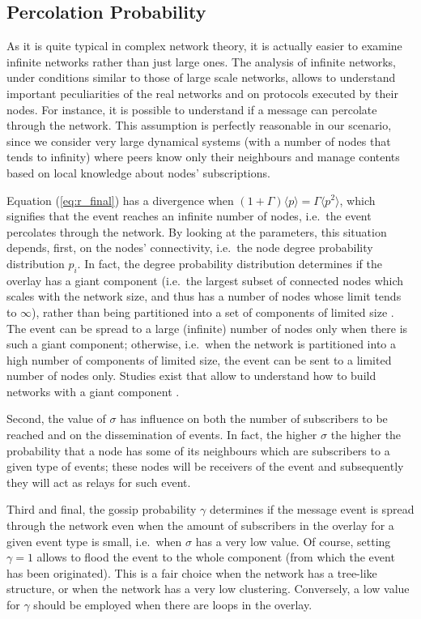 \documentclass[10pt, conference, compsocconf]{IEEEtran}
\begin{document}
\subsection{Percolation Probability}

As it is quite typical in complex network theory, it is actually easier to examine infinite networks rather than just large ones. The analysis of infinite networks, under conditions similar to those of large scale networks, allows to understand important peculiarities of the real networks and on protocols executed by their nodes. For instance, it is possible to understand if a message can percolate through the network.
This assumption is perfectly reasonable in our scenario, since we consider very large dynamical systems (with a number of nodes that tends to infinity) where peers know only their neighbours and manage contents based on local knowledge about nodes' subscriptions.

Equation (\ref{eq:r_final}) has a divergence when $(1+\Gamma)\langle p \rangle = \Gamma \langle p^2 \rangle$, which signifies that the event reaches an infinite number of nodes, i.e.~the event percolates through the network.
By looking at the parameters, this situation depends, first, on the nodes' connectivity, i.e.~the node degree probability distribution $p_i$. In fact, the degree probability distribution determines if the overlay has a giant component (i.e.~the largest subset of connected nodes which scales with the network size, and thus has a number of nodes whose limit tends to $\infty$), rather than being partitioned into a set of components of limited size \cite{newmanHandbook}. 
The event can be spread to a large (infinite) number of nodes only when there is such a giant component; otherwise, i.e.~when the network is partitioned into a high number of components of limited size,
the event can be sent to a limited number of nodes only. Studies exist that allow to understand how to build networks with a giant component \cite{Flaxman:2005,newmanHandbook}.

Second, the value of $\sigma$ has influence on both the number of subscribers to be reached and on the dissemination of events. In fact, the higher $\sigma$ the higher the probability that a node has some of its neighbours which are subscribers to a given type of events; these nodes will be receivers of the event and subsequently they will act as relays for such event. 

Third and final, the gossip probability $\gamma$ determines if the message event is spread through the network even when the amount of subscribers in the overlay for a given event type is small, i.e.~when $\sigma$ has a very low value. Of course, setting $\gamma = 1$ allows to flood the event to the whole component (from which the event has been originated). This is a fair choice when the network has a tree-like structure, or when the network has a very low clustering. Conversely, a low value for $\gamma$ should be employed when there are loops in the overlay.
\end{document}
